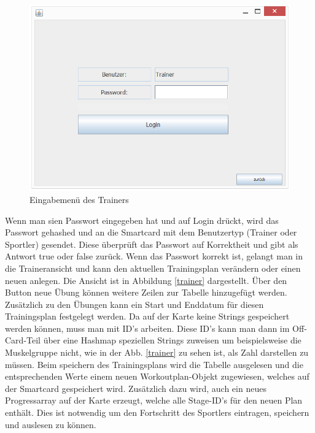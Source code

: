 \begin{figure}[h]
\includegraphics[width=1\hsize]{./images/login.png}
\caption{Eingabemenü des Trainers}
\label{login}
\end{figure}
\newpage
Wenn man sien Passwort eingegeben hat und auf Login drückt, wird das Passwort gehashed und an die Smartcard mit dem Benutzertyp (Trainer oder Sportler) gesendet. Diese überprüft das Passwort auf Korrektheit und gibt als Antwort true oder false zurück. Wenn das Passwort korrekt ist, gelangt man in die Traineransicht und kann den aktuellen Trainingsplan verändern oder einen neuen anlegen. Die Ansicht ist in Abbildung \ref{trainer} dargestellt. Über den Button neue Übung können weitere Zeilen zur Tabelle hinzugefügt werden. Zusätzlich zu den Übungen kann ein Start und Enddatum für diesen Trainingsplan festgelegt werden. Da auf der Karte keine Strings gespeichert werden können, muss man mit ID's arbeiten. Diese ID's kann man dann im Off-Card-Teil über eine Hashmap speziellen Strings zuweisen um beispielsweise die Muskelgruppe nicht, wie in der Abb. \ref{trainer} zu sehen ist, als Zahl darstellen zu müssen. Beim speichern des Trainingsplans wird die Tabelle ausgelesen und die entsprechenden Werte einem neuen Workoutplan-Objekt zugewiesen, welches auf der Smartcard gespeichert wird. Zusätzlich dazu wird, auch ein neues Progressarray auf der Karte erzeugt, welche alle Stage-ID's für den neuen Plan enthält. Dies ist notwendig um den Fortschritt des Sportlers eintragen, speichern und auslesen zu können.

